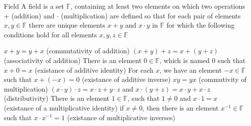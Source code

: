 \documentclass[preview]{standalone}
\begin{document}
\begin{defn*}{Field}
A field is a set $\mathbb{F}$, containing at least two elements on which two operations $+$ (addition) and $\cdot$ (multiplication) are defined so that for each pair of elements $x, y \in \mathbb{F}$ there are unique elements $x  +  y$ and $x  \cdot y$ in $\mathbb{F}$ for which the following conditions hold for all elements $x, y , z \in \mathbb{F}$

$x  +  y = y  +  x$ (commutativity of addition)
$\left(  x  +  y  \right)   +  z= x  +  \left( y  +  z \right)$ (associativity of addition)
There is an element $0 \in \mathbb{F}$, which is named $0$ such that $x  +  0 = x$ (existance of additive identity)
For each $x$, we have an element $-x \in \mathbb{F}$ such that $x  +  \left( -x \right) = 0$ (existance of additive inverse)
$xy = yx$ (commutivity of multiplication)
$\left( x  \cdot y \right)  \cdot z = x  \cdot z  +  y  \cdot z$ and $x  \cdot  \left(  y  +  z \right)= x  \cdot y  + x  \cdot z$ (distributivity)
There is an element $1 \in \mathbb{F}$, such that $1 \neq 0$ and $x  \cdot 1 =x$ (existance of a multiplicative identity)
if $x \neq 0$, then there is an element $x ^{-1} \in \mathbb{F}$ such that $x  \cdot  x ^{-1} = 1$ (existance of multiplicative inverses)

\end{defn*}
\end{document}
